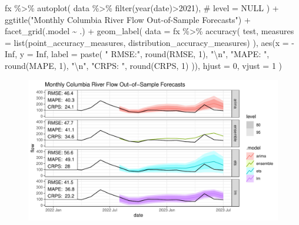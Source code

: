 \documentclass[
  letterpaper,
  DIV=11,
  numbers=noendperiod]{scrartcl}
\newenvironment{Shaded}{\begin{snugshade}}{\end{snugshade}}
\newcommand{\AttributeTok}[1]{\textcolor[rgb]{0.40,0.45,0.13}{#1}}
\newcommand{\CommentTok}[1]{\textcolor[rgb]{0.37,0.37,0.37}{#1}}
\newcommand{\ConstantTok}[1]{\textcolor[rgb]{0.56,0.35,0.01}{#1}}
\newcommand{\DecValTok}[1]{\textcolor[rgb]{0.68,0.00,0.00}{#1}}
\newcommand{\FunctionTok}[1]{\textcolor[rgb]{0.28,0.35,0.67}{#1}}
\newcommand{\NormalTok}[1]{\textcolor[rgb]{0.00,0.23,0.31}{#1}}
\newcommand{\SpecialCharTok}[1]{\textcolor[rgb]{0.37,0.37,0.37}{#1}}
\newcommand{\StringTok}[1]{\textcolor[rgb]{0.13,0.47,0.30}{#1}}
\begin{document}
\begin{Shaded}
\begin{Highlighting}[]
\NormalTok{fx }\SpecialCharTok{\%\textgreater{}\%} 
  \FunctionTok{autoplot}\NormalTok{(}
\NormalTok{    data }\SpecialCharTok{\%\textgreater{}\%} \FunctionTok{filter}\NormalTok{(}\FunctionTok{year}\NormalTok{(date)}\SpecialCharTok{\textgreater{}}\DecValTok{2021}\NormalTok{),}
    \CommentTok{\# level = NULL}
\NormalTok{  ) }\SpecialCharTok{+}
  \FunctionTok{ggtitle}\NormalTok{(}\StringTok{"Monthly Columbia River Flow Out{-}of{-}Sample Forecasts"}\NormalTok{) }\SpecialCharTok{+}
  \FunctionTok{facet\_grid}\NormalTok{(.model }\SpecialCharTok{\textasciitilde{}}\NormalTok{ .) }\SpecialCharTok{+}
  \FunctionTok{geom\_label}\NormalTok{(}
    \AttributeTok{data =}\NormalTok{ fx }\SpecialCharTok{\%\textgreater{}\%} 
      \FunctionTok{accuracy}\NormalTok{(}
\NormalTok{        test, }
        \AttributeTok{measures =} \FunctionTok{list}\NormalTok{(point\_accuracy\_measures, distribution\_accuracy\_measures)}
\NormalTok{      ),}
    \FunctionTok{aes}\NormalTok{(}\AttributeTok{x =} \SpecialCharTok{{-}}\ConstantTok{Inf}\NormalTok{, }\AttributeTok{y =} \ConstantTok{Inf}\NormalTok{, }\AttributeTok{label =} \FunctionTok{paste}\NormalTok{(}
      \StringTok{" RMSE:"}\NormalTok{, }\FunctionTok{round}\NormalTok{(RMSE, }\DecValTok{1}\NormalTok{),}
      \StringTok{"}\SpecialCharTok{\textbackslash{}n}\StringTok{"}\NormalTok{, }\StringTok{"MAPE: "}\NormalTok{, }\FunctionTok{round}\NormalTok{(MAPE, }\DecValTok{1}\NormalTok{),}
      \StringTok{"}\SpecialCharTok{\textbackslash{}n}\StringTok{"}\NormalTok{, }\StringTok{"CRPS: "}\NormalTok{, }\FunctionTok{round}\NormalTok{(CRPS, }\DecValTok{1}\NormalTok{)}
\NormalTok{    )),}
    \AttributeTok{hjust =} \DecValTok{0}\NormalTok{, }\AttributeTok{vjust =} \DecValTok{1}
\NormalTok{  )}
\end{Highlighting}
\end{Shaded}

\begin{figure}[H]

{\centering \includegraphics{Paper_files/figure-pdf/unnamed-chunk-4-1.pdf}

}

\end{figure}
\end{document}

